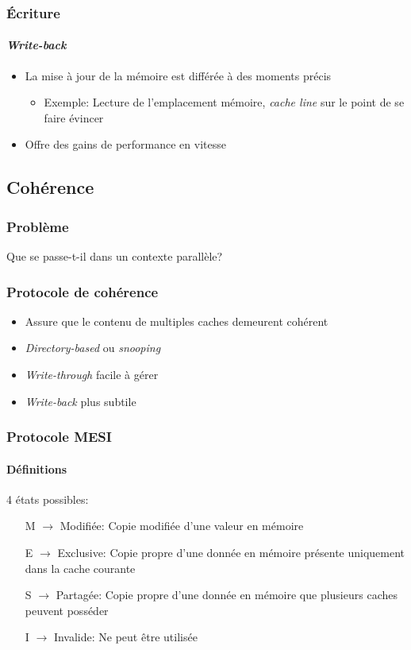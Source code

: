 \documentclass{beamer}
\begin{document}
\begin{frame}
\frametitle{Écriture}
\framesubtitle{\textit{Write-back}}
\begin{itemize}
\item La mise à jour de la mémoire est différée à des moments précis
\begin{itemize}
\item Exemple: Lecture de l'emplacement mémoire, \textit{cache line} sur le point de se faire évincer
\end{itemize}
\item Offre des gains de performance en vitesse
\end{itemize}
\end{frame}

\subsection{Cohérence}
\begin{frame}
\frametitle{Problème}
\begin{center}
\LARGE{Que se passe-t-il dans un contexte parallèle?}
\end{center}
\end{frame}

\begin{frame}
\frametitle{Protocole de cohérence}
\begin{itemize}
\item Assure que le contenu de multiples caches demeurent cohérent
\item \textit{Directory-based} ou \textit{snooping}
\item \textit{Write-through} facile à gérer
\item \textit{Write-back} plus subtile
\end{itemize}
\end{frame}

\begin{frame}
\frametitle{Protocole MESI}
\framesubtitle{Définitions}
4 états possibles: 
\begin{itemize}
\item[M] $\rightarrow$ Modifiée: Copie modifiée d'une valeur en mémoire
\item[E] $\rightarrow$ Exclusive: Copie propre d'une donnée en mémoire présente uniquement dans la cache courante
\item[S] $\rightarrow$ Partagée: Copie propre d'une donnée en mémoire que plusieurs caches peuvent posséder
\item[I] $\rightarrow$ Invalide: Ne peut être utilisée
\end{itemize}
\end{frame}
\end{document}
